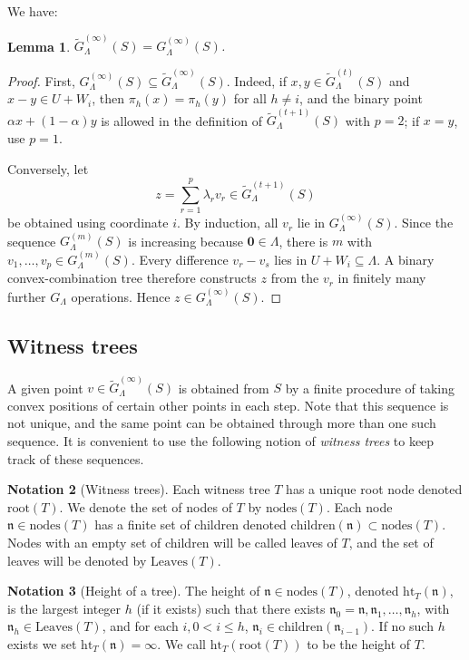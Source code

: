 \documentclass[10pt]{amsart}
\theoremstyle{plain}
\newtheorem{lemma}{Lemma}[section]
\theoremstyle{definition}
\newtheorem{notation}[lemma]{Notation}
\let\leq\leqslant
\begin{document}
We have:
\begin{lemma}
\label{lem:S-T-same}
    $\widetilde{G}^{(\infty)}_\Lambda(S)= G^{(\infty)}_\Lambda(S)$.
\end{lemma}


\begin{proof}
First, $G^{(\infty)}_\Lambda(S)\subseteq \widetilde G^{(\infty)}_\Lambda(S)$.  Indeed, if $x,y\in \widetilde G^{(t)}_\Lambda(S)$ and $x-y\in U+W_i$, then $\pi_h(x)=\pi_h(y)$ for all $h\neq i$, and the binary point $\alpha x+(1-\alpha)y$ is allowed in the definition of $\widetilde G^{(t+1)}_\Lambda(S)$ with $p=2$; if $x=y$, use $p=1$.

Conversely, let
\[
 z=\sum_{r=1}^p\lambda_r v_r\in \widetilde G^{(t+1)}_\Lambda(S)
\]
be obtained using coordinate $i$. By induction, all $v_r$ lie in $G^{(\infty)}_\Lambda(S)$.  Since the sequence $G^{(m)}_\Lambda(S)$ is increasing because $\mathbf{0}\in\Lambda$, there is $m$ with $v_1,\ldots,v_p\in G^{(m)}_\Lambda(S)$.  Every difference $v_r-v_s$ lies in $U+W_i\subseteq\Lambda$. A binary convex-combination tree therefore constructs $z$ from the $v_r$ in finitely many further $G_\Lambda$ operations. Hence $z\in G^{(\infty)}_\Lambda(S)$.
\end{proof}


\subsection{Witness trees}
\label{subsec:witness-tree}
A given point $v \in \widetilde{G}^{(\infty)}_\Lambda(S)$ is obtained from $S$ by a
finite procedure of taking convex positions of certain other points in each step. Note that this sequence is not unique, and the same point can be obtained
through more than one such sequence. It is convenient to use the following notion of \emph{witness trees} to keep track of these sequences.

\begin{notation}[Witness trees]
Each witness tree $T$ has a unique root node denoted $\mathrm{root}(T)$. 
We denote the set of nodes of $T$ by $\mathrm{nodes}(T)$.
Each node $\mathfrak{n} \in \mathrm{nodes}(T)$
has a finite set of children denoted $\mathrm{children}(\mathfrak{n}) \subset \mathrm{nodes}(T)$. 
Nodes with an empty set of children will be called leaves of $T$, and the set of leaves will be denoted by $\mathrm{Leaves}(T)$. 
\end{notation}

\begin{notation}[Height of a tree]
The height of $\mathfrak{n} \in \mathrm{nodes}(T)$,
denoted $\mathrm{ht}_T(\mathfrak{n})$, 
is the largest integer $h$ (if it exists) such that there exists 
$\mathfrak{n}_0 = \mathfrak{n}, \mathfrak{n}_1,\ldots,\mathfrak{n}_h$,
with $\mathfrak{n}_h \in \mathrm{Leaves}(T)$, and for each $i, 0 < i \leq h$,
$\mathfrak{n}_i \in \mathrm{children}(\mathfrak{n}_{i-1})$. If no such $h$ exists we set $\mathrm{ht}_T(\mathfrak{n}) = \infty$. 
We call $\mathrm{ht}_T(\mathrm{root}(T))$ to be the height of $T$.
\end{notation}
\end{document}

